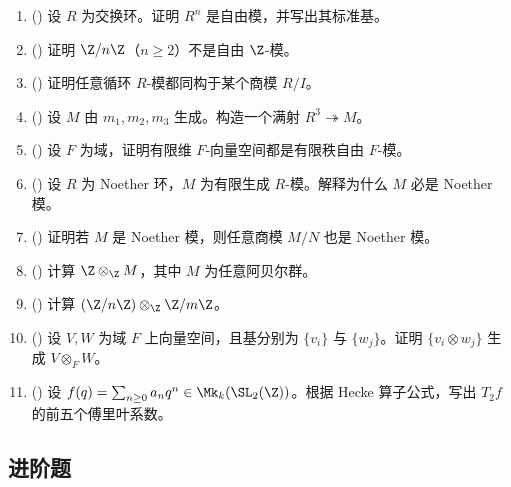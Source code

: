 \begin{enumerate}[label=\textbf{10.\arabic*.}, leftmargin=3.2em]
  \item (\basic) 设 $R$ 为交换环。证明 $R^n$ 是自由模，并写出其标准基。

  \item (\basic) 证明 $\Z/n\Z$（$n\ge 2$）不是自由 $\Z$-模。

  \item (\basic) 证明任意循环 $R$-模都同构于某个商模 $R/I$。

  \item (\basic) 设 $M$ 由 $m_1,m_2,m_3$ 生成。构造一个满射 $R^3\twoheadrightarrow M$。

  \item (\basic) 设 $F$ 为域，证明有限维 $F$-向量空间都是有限秩自由 $F$-模。

  \item (\basic) 设 $R$ 为 Noether 环，$M$ 为有限生成 $R$-模。解释为什么 $M$ 必是 Noether 模。

  \item (\basic) 证明若 $M$ 是 Noether 模，则任意商模 $M/N$ 也是 Noether 模。

  \item (\basic) 计算 $\Z\otimes_\Z M$，其中 $M$ 为任意阿贝尔群。

  \item (\basic) 计算 $(\Z/n\Z)\otimes_\Z \Z/m\Z$。

  \item (\basic) 设 $V,W$ 为域 $F$ 上向量空间，且基分别为 $\{v_i\}$ 与 $\{w_j\}$。证明 $\{v_i\otimes w_j\}$ 生成 $V\otimes_F W$。

  \item (\basic) 设 $f(q)=\sum_{n\ge 0} a_nq^n\in \Mk_k(\SL_2(\Z))$。根据 Hecke 算子公式，写出 $T_2f$ 的前五个傅里叶系数。
\end{enumerate}

\subsection*{进阶题}

